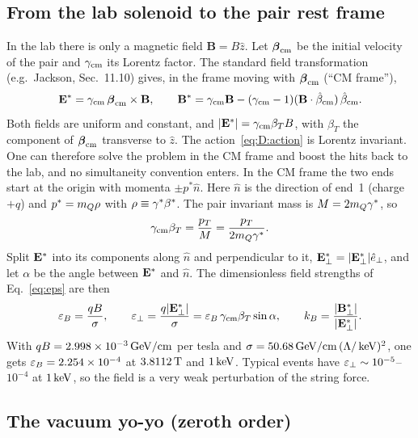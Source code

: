 \subsection{From the lab solenoid to the pair rest frame}\label{app:der:frame}
In the lab there is only a magnetic field $\mathbf B=B\hat z$. Let $\boldsymbol\beta_{\rm cm}$ be the initial velocity of
the pair and $\gamma_{\rm cm}$ its Lorentz factor. The standard field transformation (e.g.\ Jackson, Sec.~11.10) gives,
in the frame moving with $\boldsymbol\beta_{\rm cm}$ (``CM frame''),
\begin{equation}
  \Estar=\gamma_{\rm cm}\,\boldsymbol\beta_{\rm cm}\times\mathbf B,\qquad
  \Bstar=\gamma_{\rm cm}\mathbf B-(\gamma_{\rm cm}-1)(\mathbf B\cdot\hat\beta_{\rm cm})\,\hat\beta_{\rm cm}.
  \label{eq:D:fields}
\end{equation}
Both fields are uniform and constant, and $|\Estar|=\gamma_{\rm cm}\beta_T B$, with $\beta_T$ the component of
$\boldsymbol\beta_{\rm cm}$ transverse to $\hat z$. The action~\eqref{eq:D:action} is Lorentz invariant. One can therefore
solve the problem in the CM frame and boost the hits back to the lab, and no simultaneity convention enters. In the CM
frame the two ends start at the origin with momenta $\pm p^*\hat n$. Here $\hat n$ is the direction of end~1 (charge $+q$)
and $p^*=\mQ\rho$ with $\rho\equiv\gst\bst$. The pair invariant mass is $M=2\mQ\gst$, so
\begin{equation}
  \gamma_{\rm cm}\beta_T=\frac{p_T}{M}=\frac{p_T}{2\mQ\gst}.
  \label{eq:D:gbT}
\end{equation}
Split $\Estar$ into its components along $\hat n$ and perpendicular to it, $\Estar_\perp=|\Estar_\perp|\hat e_\perp$,
and let $\alpha$ be the angle between $\Estar$ and $\hat n$. The dimensionless field strengths of Eq.~\eqref{eq:eps} are
then
\begin{equation}
  \epsB=\frac{qB}{\sigma},\qquad
  \epsp=\frac{q|\Estar_\perp|}{\sigma}=\epsB\,\gamma_{\rm cm}\beta_T\sin\alpha,\qquad
  \kB=\frac{|\Bstar_\perp|}{|\Estar_\perp|}.
  \label{eq:D:eps}
\end{equation}
With $qB=2.998\times10^{-3}\GeV/\mathrm{cm}$ per tesla and $\sigma=50.68\GeV/\mathrm{cm}\,(\Lam/\keV)^2$, one gets
$\epsB=2.254\times10^{-4}$ at $3.8112\tesla$ and $1\keV$. Typical events have $\epsp\sim10^{-5}$--$10^{-4}$ at $1\keV$,
so the field is a very weak perturbation of the string force.

\subsection{The vacuum yo-yo (zeroth order)}\label{app:der:yoyo}
